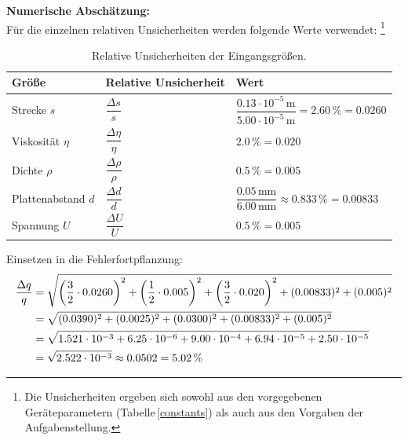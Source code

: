 \documentclass[12pt,a4paper,titlepage]{scrartcl}
\numberwithin{equation}{section}
\numberwithin{table}{section}
\numberwithin{figure}{section}
\begin{document}
\medskip
\noindent
\textbf{Numerische Abschätzung:}\\
Für die einzelnen relativen Unsicherheiten werden folgende Werte verwendet:
\footnote{Die Unsicherheiten ergeben sich sowohl aus den vorgegebenen Geräteparametern (Tabelle\,\ref{constants}) als auch aus den Vorgaben der Aufgabenstellung.}


\begin{table}[H]
    \centering
    \caption{Relative Unsicherheiten der Eingangsgrößen.}
    \begin{tabular}{lll}
        \toprule
        \textbf{Größe} & \textbf{Relative Unsicherheit} & \textbf{Wert} \\
        \midrule
        Strecke $s$ & $\dfrac{\Delta s}{s}$ & $\dfrac{0.13 \cdot 10^{-5}\,\text{m}}{5.00 \cdot 10^{-5}\,\text{m}} = 2.60\,\% = 0.0260$ \\
        Viskosität $\eta$ & $\dfrac{\Delta \eta}{\eta}$ & $2.0\,\% = 0.020$ \\
        Dichte $\rho$ & $\dfrac{\Delta \rho}{\rho}$ & $0.5\,\% = 0.005$ \\
        Plattenabstand $d$ & $\dfrac{\Delta d}{d}$ & $\dfrac{0.05\,\text{mm}}{6.00\,\text{mm}} \approx 0.833\,\% = 0.00833$ \\
        Spannung $U$ & $\dfrac{\Delta U}{U}$ & $0.5\,\% = 0.005$\footnotemark \\
        \bottomrule
    \end{tabular}
\end{table}

\medskip
\noindent
Einsetzen in die Fehlerfortpflanzung:
\begin{align}
    \frac{\Delta q}{q} &= \sqrt{\left(\frac{3}{2} \cdot 0.0260\right)^2 + \left(\frac{1}{2} \cdot 0.005\right)^2 + \left(\frac{3}{2} \cdot 0.020\right)^2 + (0.00833)^2 + (0.005)^2} \notag \\
    &= \sqrt{(0.0390)^2 + (0.0025)^2 + (0.0300)^2 + (0.00833)^2 + (0.005)^2} \notag \\
    &= \sqrt{1.521 \cdot 10^{-3} + 6.25 \cdot 10^{-6} + 9.00 \cdot 10^{-4} + 6.94 \cdot 10^{-5} + 2.50 \cdot 10^{-5}} \notag \\
    &= \sqrt{2.522 \cdot 10^{-3}} \approx 0.0502 = 5.02\,\%
\end{align}
\end{document}
